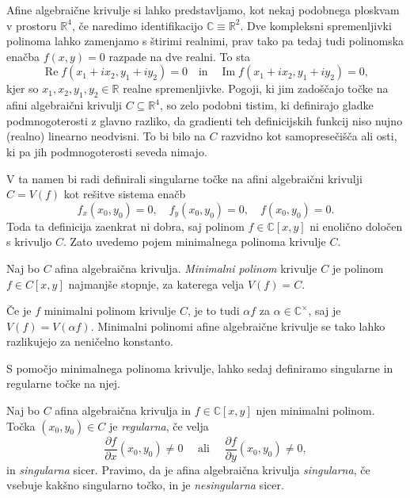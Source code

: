 \documentclass[mat1]{fmfdelo}
\numberwithin{equation}{section}
\newcommand{\R}{\mathbb R}
\newcommand{\C}{\mathbb C}
\newcommand{\CM}{\mathbb C ^\times}
\renewcommand\Re{\operatorname{Re}}%
\renewcommand\Im{\operatorname{Im}}%
\theoremstyle{definition}
\begin{document}
Afine algebraične krivulje si lahko predstavljamo, kot nekaj podobnega ploskvam v prostoru $\R^4$, če naredimo identifikacijo $\C \equiv \R^2$. Dve kompleksni spremenljivki polinoma lahko zamenjamo s štirimi realnimi, prav tako pa tedaj tudi polinomska enačba $f(x,y) = 0$ razpade na dve realni. To sta
\[
    \Re f(x_1 + ix_2, y_1 + iy_2) = 0 \quad \text{in} \quad \Im f(x_1 + ix_2, y_1 + iy_2) = 0,
\]
kjer so $x_1, x_2, y_1, y_2 \in \R$ realne spremenljivke.
Pogoji, ki jim zadoščajo točke na afini algebraični krivulji $C \subseteq \R^4$, so zelo podobni tistim, ki definirajo gladke pod\-mnogoterosti z glavno razliko, da gradienti teh definicijskih funkcij niso nujno (realno) linearno neodvisni. To bi bilo na $C$ razvidno kot samopresečišča ali osti, ki pa jih podmnogoterosti seveda nimajo. 
\par
V ta namen bi radi definirali singularne točke na afini algebraični krivulji $C = V(f)$ kot rešitve sistema enačb 
\[ 
    f_x(x_0, y_0) = 0, \quad f_y(x_0, y_0) = 0, \quad f(x_0, y_0) = 0.
\]
Toda ta definicija zaenkrat ni dobra, saj polinom $f \in \C[x,y]$ ni enolično določen s krivuljo $C$. 
Zato uvedemo pojem minimalnega polinoma krivulje $C$.

\begin{definicija}
    Naj bo $C$ afina algebraična krivulja. \emph{Minimalni polinom} krivulje $C$ je polinom $f \in C[x,y]$ najmanjše stopnje, za katerega velja $V(f) = C$.
\end{definicija}

\begin{opomba}
    Če je $f$ minimalni polinom krivulje $C$, je to tudi $\alpha f$ za $\alpha \in \CM$, saj je $V(f) = V(\alpha f)$. Minimalni polinomi afine algebraične krivulje se tako lahko razlikujejo za neničelno konstanto.
\end{opomba}

S pomočjo minimalnega polinoma krivulje, lahko sedaj definiramo singularne in regularne točke na njej.

\begin{definicija}
    \label{reg sing tocke}
    Naj bo $C$ afina algebraična krivulja in $f \in \C[x,y]$ njen minimalni polinom. Točka $(x_0, y_0) \in C$ je \emph{regularna}, če velja
    \[
        \frac{\partial f}{\partial x}(x_0, y_0) \neq 0 \quad \text{ ali } \quad \frac{\partial f}{\partial y}(x_0, y_0) \neq 0,
    \] 
    in \emph{singularna} sicer. Pravimo, da je afina algebraična krivulja \emph{singularna}, če vsebuje kakšno singularno točko, in je \emph{nesingularna} sicer.
\end{definicija}
\end{document}
